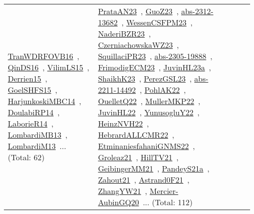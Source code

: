 {\begin{longtable}{lp{3cm}>{\raggedright\arraybackslash}p{6cm}>{\raggedright\arraybackslash}p{6cm}>{\raggedright\arraybackslash}p{8cm}}
\href{../works/TranWDRFOVB16.pdf}{TranWDRFOVB16}~\cite{TranWDRFOVB16}, \href{../works/QinDS16.pdf}{QinDS16}~\cite{QinDS16}, \href{../works/VilimLS15.pdf}{VilimLS15}~\cite{VilimLS15}, \href{../works/Derrien15.pdf}{Derrien15}~\cite{Derrien15}, \href{../works/GoelSHFS15.pdf}{GoelSHFS15}~\cite{GoelSHFS15}, \href{../works/HarjunkoskiMBC14.pdf}{HarjunkoskiMBC14}~\cite{HarjunkoskiMBC14}, \href{../works/DoulabiRP14.pdf}{DoulabiRP14}~\cite{DoulabiRP14}, \href{../works/LaborieR14.pdf}{LaborieR14}~\cite{LaborieR14}, \href{../works/LombardiMB13.pdf}{LombardiMB13}~\cite{LombardiMB13}, \href{../works/LombardiM13.pdf}{LombardiM13}~\cite{LombardiM13}... (Total: 62) & \href{../works/PrataAN23.pdf}{PrataAN23}~\cite{PrataAN23}, \href{../works/GuoZ23.pdf}{GuoZ23}~\cite{GuoZ23}, \href{../works/abs-2312-13682.pdf}{abs-2312-13682}~\cite{abs-2312-13682}, \href{../works/WessenCSFPM23.pdf}{WessenCSFPM23}~\cite{WessenCSFPM23}, \href{../works/NaderiBZR23.pdf}{NaderiBZR23}~\cite{NaderiBZR23}, \href{../works/CzerniachowskaWZ23.pdf}{CzerniachowskaWZ23}~\cite{CzerniachowskaWZ23}, \href{../works/SquillaciPR23.pdf}{SquillaciPR23}~\cite{SquillaciPR23}, \href{../works/abs-2305-19888.pdf}{abs-2305-19888}~\cite{abs-2305-19888}, \href{../works/FrimodigECM23.pdf}{FrimodigECM23}~\cite{FrimodigECM23}, \href{../works/JuvinHL23a.pdf}{JuvinHL23a}~\cite{JuvinHL23a}, \href{../works/ShaikhK23.pdf}{ShaikhK23}~\cite{ShaikhK23}, \href{../works/PerezGSL23.pdf}{PerezGSL23}~\cite{PerezGSL23}, \href{../works/abs-2211-14492.pdf}{abs-2211-14492}~\cite{abs-2211-14492}, \href{../works/PohlAK22.pdf}{PohlAK22}~\cite{PohlAK22}, \href{../works/OuelletQ22.pdf}{OuelletQ22}~\cite{OuelletQ22}, \href{../works/MullerMKP22.pdf}{MullerMKP22}~\cite{MullerMKP22}, \href{../works/JuvinHL22.pdf}{JuvinHL22}~\cite{JuvinHL22}, \href{../works/YunusogluY22.pdf}{YunusogluY22}~\cite{YunusogluY22}, \href{../works/HeinzNVH22.pdf}{HeinzNVH22}~\cite{HeinzNVH22}, \href{../works/HebrardALLCMR22.pdf}{HebrardALLCMR22}~\cite{HebrardALLCMR22}, \href{../works/EtminaniesfahaniGNMS22.pdf}{EtminaniesfahaniGNMS22}~\cite{EtminaniesfahaniGNMS22}, \href{../works/Groleaz21.pdf}{Groleaz21}~\cite{Groleaz21}, \href{../works/HillTV21.pdf}{HillTV21}~\cite{HillTV21}, \href{../works/GeibingerMM21.pdf}{GeibingerMM21}~\cite{GeibingerMM21}, \href{../works/PandeyS21a.pdf}{PandeyS21a}~\cite{PandeyS21a}, \href{../works/Zahout21.pdf}{Zahout21}~\cite{Zahout21}, \href{../works/Astrand0F21.pdf}{Astrand0F21}~\cite{Astrand0F21}, \href{../works/ZhangYW21.pdf}{ZhangYW21}~\cite{ZhangYW21}, \href{../works/Mercier-AubinGQ20.pdf}{Mercier-AubinGQ20}~\cite{Mercier-AubinGQ20}... (Total: 112)\\

\end{longtable}}
